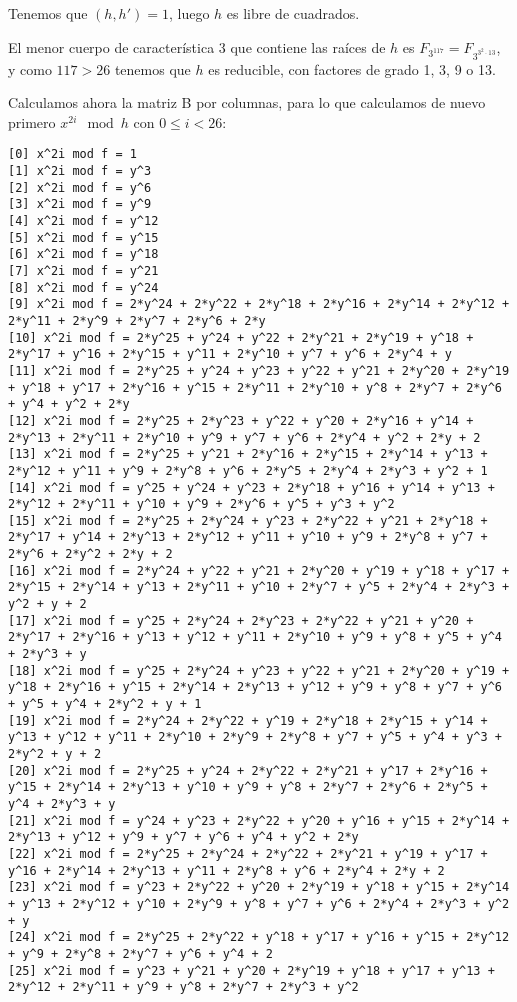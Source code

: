 \documentclass[a4paper]{article}
\begin{document}
Tenemos que $(h, h')=1$, luego $h$ es libre de cuadrados.

El menor cuerpo de característica 3 que contiene las raíces de $h$ es $F_{3^{117}}=F_{3^{3^2\cdot 13}}$, y como $117>26$ tenemos que $h$ es reducible, con factores de grado 1, 3, 9 o 13.

Calculamos ahora la matriz B por columnas, para lo que calculamos de nuevo primero $x^{2i}\mod h$ con $0\leq i < 26$:

\begin{verbatim}
[0] x^2i mod f = 1
[1] x^2i mod f = y^3
[2] x^2i mod f = y^6
[3] x^2i mod f = y^9
[4] x^2i mod f = y^12
[5] x^2i mod f = y^15
[6] x^2i mod f = y^18
[7] x^2i mod f = y^21
[8] x^2i mod f = y^24
[9] x^2i mod f = 2*y^24 + 2*y^22 + 2*y^18 + 2*y^16 + 2*y^14 + 2*y^12 + 2*y^11 + 2*y^9 + 2*y^7 + 2*y^6 + 2*y
[10] x^2i mod f = 2*y^25 + y^24 + y^22 + 2*y^21 + 2*y^19 + y^18 + 2*y^17 + y^16 + 2*y^15 + y^11 + 2*y^10 + y^7 + y^6 + 2*y^4 + y
[11] x^2i mod f = 2*y^25 + y^24 + y^23 + y^22 + y^21 + 2*y^20 + 2*y^19 + y^18 + y^17 + 2*y^16 + y^15 + 2*y^11 + 2*y^10 + y^8 + 2*y^7 + 2*y^6 + y^4 + y^2 + 2*y
[12] x^2i mod f = 2*y^25 + 2*y^23 + y^22 + y^20 + 2*y^16 + y^14 + 2*y^13 + 2*y^11 + 2*y^10 + y^9 + y^7 + y^6 + 2*y^4 + y^2 + 2*y + 2
[13] x^2i mod f = 2*y^25 + y^21 + 2*y^16 + 2*y^15 + 2*y^14 + y^13 + 2*y^12 + y^11 + y^9 + 2*y^8 + y^6 + 2*y^5 + 2*y^4 + 2*y^3 + y^2 + 1
[14] x^2i mod f = y^25 + y^24 + y^23 + 2*y^18 + y^16 + y^14 + y^13 + 2*y^12 + 2*y^11 + y^10 + y^9 + 2*y^6 + y^5 + y^3 + y^2
[15] x^2i mod f = 2*y^25 + 2*y^24 + y^23 + 2*y^22 + y^21 + 2*y^18 + 2*y^17 + y^14 + 2*y^13 + 2*y^12 + y^11 + y^10 + y^9 + 2*y^8 + y^7 + 2*y^6 + 2*y^2 + 2*y + 2
[16] x^2i mod f = 2*y^24 + y^22 + y^21 + 2*y^20 + y^19 + y^18 + y^17 + 2*y^15 + 2*y^14 + y^13 + 2*y^11 + y^10 + 2*y^7 + y^5 + 2*y^4 + 2*y^3 + y^2 + y + 2
[17] x^2i mod f = y^25 + 2*y^24 + 2*y^23 + 2*y^22 + y^21 + y^20 + 2*y^17 + 2*y^16 + y^13 + y^12 + y^11 + 2*y^10 + y^9 + y^8 + y^5 + y^4 + 2*y^3 + y
[18] x^2i mod f = y^25 + 2*y^24 + y^23 + y^22 + y^21 + 2*y^20 + y^19 + y^18 + 2*y^16 + y^15 + 2*y^14 + 2*y^13 + y^12 + y^9 + y^8 + y^7 + y^6 + y^5 + y^4 + 2*y^2 + y + 1
[19] x^2i mod f = 2*y^24 + 2*y^22 + y^19 + 2*y^18 + 2*y^15 + y^14 + y^13 + y^12 + y^11 + 2*y^10 + 2*y^9 + 2*y^8 + y^7 + y^5 + y^4 + y^3 + 2*y^2 + y + 2
[20] x^2i mod f = 2*y^25 + y^24 + 2*y^22 + 2*y^21 + y^17 + 2*y^16 + y^15 + 2*y^14 + 2*y^13 + y^10 + y^9 + y^8 + 2*y^7 + 2*y^6 + 2*y^5 + y^4 + 2*y^3 + y
[21] x^2i mod f = y^24 + y^23 + 2*y^22 + y^20 + y^16 + y^15 + 2*y^14 + 2*y^13 + y^12 + y^9 + y^7 + y^6 + y^4 + y^2 + 2*y
[22] x^2i mod f = 2*y^25 + 2*y^24 + 2*y^22 + 2*y^21 + y^19 + y^17 + y^16 + 2*y^14 + 2*y^13 + y^11 + 2*y^8 + y^6 + 2*y^4 + 2*y + 2
[23] x^2i mod f = y^23 + 2*y^22 + y^20 + 2*y^19 + y^18 + y^15 + 2*y^14 + y^13 + 2*y^12 + y^10 + 2*y^9 + y^8 + y^7 + y^6 + 2*y^4 + 2*y^3 + y^2 + y
[24] x^2i mod f = 2*y^25 + 2*y^22 + y^18 + y^17 + y^16 + y^15 + 2*y^12 + y^9 + 2*y^8 + 2*y^7 + y^6 + y^4 + 2
[25] x^2i mod f = y^23 + y^21 + y^20 + 2*y^19 + y^18 + y^17 + y^13 + 2*y^12 + 2*y^11 + y^9 + y^8 + 2*y^7 + 2*y^3 + y^2
\end{verbatim}
\end{document}
